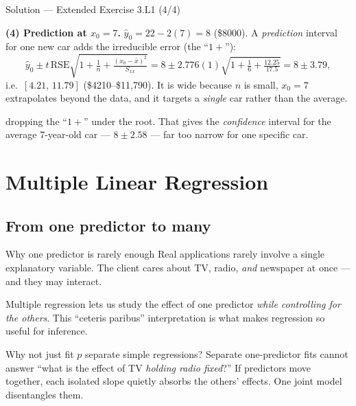\documentclass[aspectratio=169,11pt]{beamer}
\begin{document}
\begin{frame}{Solution --- Extended Exercise 3.L1 (4/4)}
  \begin{solutionbox}
    \textbf{(4) Prediction at $x_0=7$.} $\hat y_0=22-2(7)=8$
    (\$8000). A \emph{prediction} interval for one new car adds the
    irreducible error (the ``$1+$''):
    \[
      \hat y_0\pm t\,\mathrm{RSE}\sqrt{1+\tfrac1n+\tfrac{(x_0-\bar x)^2}{S_{xx}}}
      =8\pm 2.776(1)\sqrt{1+\tfrac16+\tfrac{12.25}{17.5}}=8\pm 3.79,
    \]
    i.e.\ $[4.21,\,11.79]$ (\$4210--\$11{,}790). It is wide because $n$ is
    small, $x_0=7$ extrapolates beyond the data, and it targets a
    \emph{single} car rather than the average.
  \end{solutionbox}
  \begin{mistake}
    dropping the ``$1+$'' under the root. That
    gives the \emph{confidence} interval for the average 7-year-old car ---
    $8 \pm 2.58$ --- far too narrow for one specific car.
  \end{mistake}
\end{frame}





\section{Multiple Linear Regression}
\subsection{From one predictor to many}

\begin{frame}{Why one predictor is rarely enough}
  Real applications rarely involve a single explanatory variable. The
  client cares about TV, radio, \emph{and} newspaper at once --- and
  they may interact.
  \begin{takeaway}
    Multiple regression lets us study the effect of one predictor
    \emph{while controlling for the others}. This ``ceteris paribus''
    interpretation is what makes regression so useful for inference.
  \end{takeaway}
  \begin{alertblock}{Why not just fit $p$ separate simple regressions?}
    Separate one-predictor fits cannot answer ``what is the effect of TV
    \emph{holding radio fixed}?'' If predictors move together, each
    isolated slope quietly absorbs the others' effects. One joint model
    disentangles them.
  \end{alertblock}
\end{frame}
\end{document}
